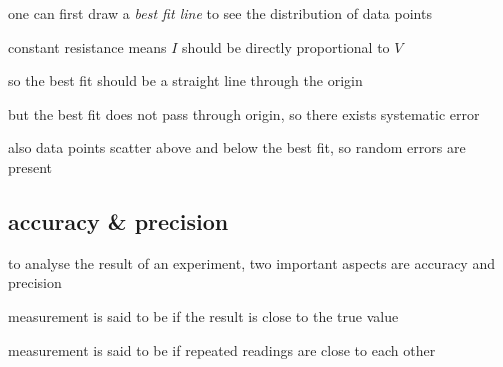 
\sol one can first draw a \emph{best fit line} to see the distribution of data points

constant resistance means $I$ should be directly proportional to $V$

so the best fit should be a straight line through the origin

but the best fit does not pass through origin, so there exists systematic error

also data points scatter above and below the best fit, so random errors are present \eoe


\subsection{accuracy \& precision}

to analyse the result of an experiment, two important aspects are accuracy and precision

\begin{ilight}
	\centering measurement is said to be  if the result is close to the true value
\end{ilight}

\begin{ilight}
	\centering measurement is said to be  if repeated readings are close to each other
\end{ilight}

